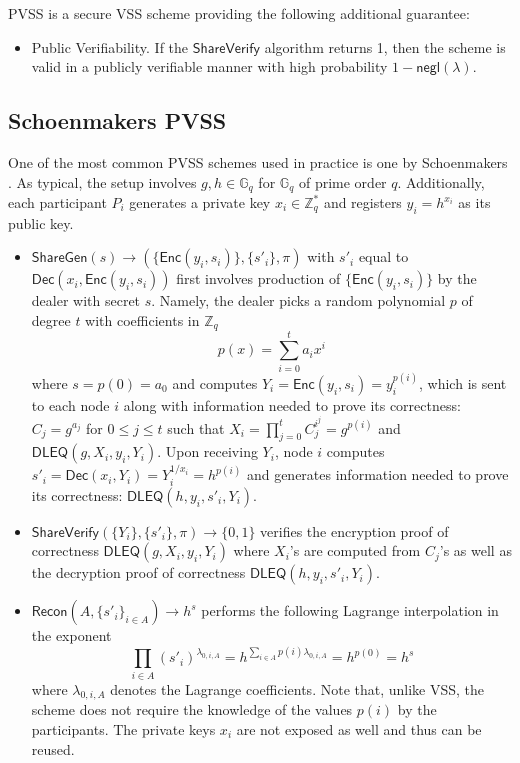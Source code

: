 \documentclass[letterpaper,twocolumn,10pt]{article}
\theoremstyle{definition}
\theoremstyle{remark}
\begin{document}
PVSS is a secure VSS scheme providing the following additional guarantee:
\begin{itemize}
    \item Public Verifiability. If the $\mathsf{ShareVerify}$ algorithm returns 1, then the scheme is valid in a publicly verifiable manner with high probability $1 - \mathsf{negl}(\lambda)$.
\end{itemize}

\subsection{Schoenmakers PVSS}
\label{appendix:schoenmakersPVSS}
One of the most common PVSS schemes used in practice is one by Schoenmakers \cite{schoenmakers1999simple}. As typical, the setup involves $g, h \in \mathbb{G}_q$ for $\mathbb{G}_q$ of prime order $q$. Additionally, each participant $P_i$ generates a private key $x_i \in \mathbb{Z}^*_q$ and registers $y_i = h^{x_i}$ as its public key.

\begin{itemize}
\item $\mathsf{ShareGen}(s) \rightarrow (\{\mathsf{Enc}(y_i, s_i)\}, \{s'_i\}, \pi)$ with $s'_i$ equal to $\mathsf{Dec}(x_i, \mathsf{Enc}(y_i, s_i))$ first involves production of $\{\mathsf{Enc}(y_i, s_i)\}$ by the dealer with secret $s$. Namely, the dealer picks a random polynomial $p$ of degree $t$ with coefficients in $\mathbb{Z}_q$
\[
p(x) = \sum_{i = 0}^{t} a_i x^i
\]
where $s = p(0) = a_0$ and computes $Y_i = \mathsf{Enc}(y_i, s_i) = y_i^{p(i)}$, which is sent to each node $i$ along with information needed to prove its correctness: $C_j = g^{a_j}$ for $0 \leq j \leq t$ such that $X_i = \prod_{j = 0}^{t} C_j^{i^j} = g^{p(i)}$ and $\mathsf{DLEQ}(g, X_i, y_i, Y_i)$. Upon receiving $Y_i$, node $i$ computes $s'_i = \mathsf{Dec}(x_i, Y_i) = Y_i^{1 / x_i} = h^{p(i)}$ and generates information needed to prove its correctness: $\mathsf{DLEQ}(h, y_i, s'_i, Y_i)$.
\item $\mathsf{ShareVerify}(\{Y_i\}, \{s'_i\}, \pi) \rightarrow \{0, 1\}$ verifies the encryption proof of correctness $\mathsf{DLEQ}(g, X_i, y_i, Y_i)$ where $X_i$'s are computed from $C_j$'s as well as the decryption proof of correctness $\mathsf{DLEQ}(h, y_i, s'_i, Y_i)$.
\item $\mathsf{Recon}(A, \{s'_i\}_{i \in A}) \rightarrow h^s$ performs the following Lagrange interpolation in the exponent
\[
\prod_{i \in A} (s'_i)^{\lambda_{0, i, A}} = h^{\sum_{i \in A} p(i) \lambda_{0, i, A}} = h^{p(0)} = h^s
\]
where $\lambda_{0, i, A}$ denotes the Lagrange coefficients. Note that, unlike VSS, the scheme does not require the knowledge of the values $p(i)$ by the participants. The private keys $x_i$ are not exposed as well and thus can be reused.
\end{itemize}
\end{document}
